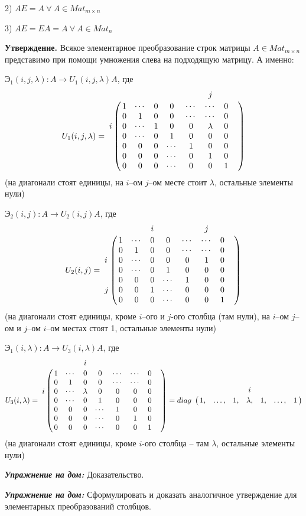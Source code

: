 2) $AE = A \ \forall \ A \in Mat_{m \times n}$

3) $AE = EA = A \ \forall \ A \in Mat_n$

\bigskip
\textbf{Утверждение.} Всякое элементарное преобразование строк матрицы $A \in Mat_{m \times n}$ представимо при помощи умножения слева на подходящую матрицу. А именно:

$Э_1(i, j, \lambda): A \rightarrow U_1(i, j, \lambda) A$, где
\begin{equation*} U_1(i, j, \lambda) = \bordermatrix{ 
    	 & & & & & & j & &  \cr
    	 & 1 & \cdots & 0 & 0 & \cdots & \cdots & 0 \cr 
          & 0 & 1 & 0 & 0 & \cdots & \cdots & 0 \cr
		i & 0 & \cdots & 1 & 0 & 0 & \lambda & 0  \cr
         & 0 & \cdots & 0 & 1 & 0 & 0 & 0  \cr
        & 0 & 0 & 0 & \cdots & 1 & 0 & 0  \cr
        & 0 & 0 & 0 & \cdots & 0 & 1 & 0  \cr
        & 0 & 0 & 0 & \cdots & 0 & 0 & 1 }
\end{equation*}
(на диагонали стоят единицы, на $i$--ом $j$--ом месте стоит $\lambda$, остальные элементы нули)

\bigskip
$Э_2(i, j): A \rightarrow U_2(i, j) A$, где
\begin{equation*} U_2(i, j) = \bordermatrix{ 
    	 & & & i & & & j & &  \cr
    	 & 1 & \cdots & 0 & 0 & \cdots & \cdots & 0 \cr 
          & 0 & 1 & 0 & 0 & \cdots & \cdots & 0 \cr
		i & 0 & \cdots & 0 & 0 & 0 & 1 & 0  \cr
         & 0 & \cdots & 0 & 1 & 0 & 0 & 0  \cr
        & 0 & 0 & 0 & \cdots & 1 & 0 & 0  \cr
        j & 0 & 0 & 1 & \cdots & 0 & 0 & 0  \cr
        & 0 & 0 & 0 & \cdots & 0 & 0 & 1 }
\end{equation*}
(на диагонали стоят единицы, кроме $i$--ого и $j$-ого столбца (там нули), на $i$--ом $j$--ом и $j$--ом $i$--ом местах стоят 1, остальные элементы нули)

\bigskip
$Э_1(i, \lambda): A \rightarrow U_3(i, \lambda) A$, где
\begin{equation*} U_3(i,\lambda) = \bordermatrix{ 
    	 & & & i & & & & &  \cr
    	 & 1 & \cdots & 0 & 0 & \cdots & \cdots & 0 \cr 
          & 0 & 1 & 0 & 0 & \cdots & \cdots & 0 \cr
		i & 0 & \cdots & \lambda & 0 & 0 & 0 & 0  \cr
         & 0 & \cdots & 0 & 1 & 0 & 0 & 0  \cr
        & 0 & 0 & 0 & \cdots & 1 & 0 & 0  \cr
        & 0 & 0 & 0 & \cdots & 0 & 1 & 0  \cr
        & 0 & 0 & 0 & \cdots & 0 & 0 & 1 } = diag 
        \bordermatrix{
        & & & & i & & \cr
        & 1, & \dots, & 1, & \lambda, & 1, & \dots, & 1}
\end{equation*}
(на диагонали стоят единицы, кроме $i$-ого столбца -- там $\lambda$, остальные элементы нули)

\bigskip
\textbf{\textit{Упражнение на дом:}} Доказательство.

\textbf{\textit{Упражнение на дом:}} Сформулировать и доказать аналогичное утверждение для элементарных преобразований столбцов.

